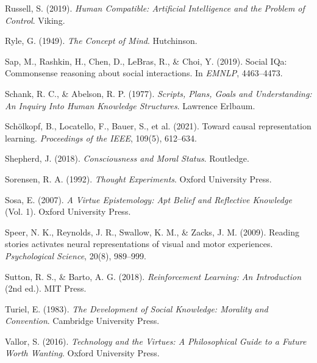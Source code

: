 \documentclass[12pt]{article}
\begin{document}
\begin{thebibliography}{99}
Russell, S. (2019).
\newblock \textit{Human Compatible: Artificial Intelligence and the Problem of Control}.
\newblock Viking.

Ryle, G. (1949).
\newblock \textit{The Concept of Mind}.
\newblock Hutchinson.

Sap, M., Rashkin, H., Chen, D., LeBras, R., \& Choi, Y. (2019).
\newblock Social IQa: Commonsense reasoning about social interactions.
\newblock In \textit{EMNLP}, 4463--4473.

Schank, R. C., \& Abelson, R. P. (1977).
\newblock \textit{Scripts, Plans, Goals and Understanding: An Inquiry Into Human Knowledge Structures}.
\newblock Lawrence Erlbaum.

Schölkopf, B., Locatello, F., Bauer, S., et al. (2021).
\newblock Toward causal representation learning.
\newblock \textit{Proceedings of the IEEE}, 109(5), 612--634.

Shepherd, J. (2018).
\newblock \textit{Consciousness and Moral Status}.
\newblock Routledge.

Sorensen, R. A. (1992).
\newblock \textit{Thought Experiments}.
\newblock Oxford University Press.

Sosa, E. (2007).
\newblock \textit{A Virtue Epistemology: Apt Belief and Reflective Knowledge} (Vol. 1).
\newblock Oxford University Press.

Speer, N. K., Reynolds, J. R., Swallow, K. M., \& Zacks, J. M. (2009).
\newblock Reading stories activates neural representations of visual and motor experiences.
\newblock \textit{Psychological Science}, 20(8), 989--999.

Sutton, R. S., \& Barto, A. G. (2018).
\newblock \textit{Reinforcement Learning: An Introduction} (2nd ed.).
\newblock MIT Press.

Turiel, E. (1983).
\newblock \textit{The Development of Social Knowledge: Morality and Convention}.
\newblock Cambridge University Press.

Vallor, S. (2016).
\newblock \textit{Technology and the Virtues: A Philosophical Guide to a Future Worth Wanting}.
\newblock Oxford University Press.


\end{thebibliography}
\end{document}
